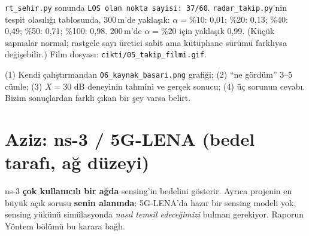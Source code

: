 \documentclass[10.5pt,a4paper]{article}
\begin{document}
\begin{kontrol}
\texttt{rt\_sehir.py} sonunda \texttt{LOS olan nokta sayisi: 37/60}. \texttt{radar\_takip.py}'nin tespit olasılığı tablosunda, 300\,m'de yaklaşık: $\alpha=\%10$: 0,01; \%20: 0,13; \%40: 0,49; \%50: 0,71; \%100: 0,98. 200\,m'de $\alpha=\%20$ için yaklaşık 0,99. (Küçük sapmalar normal; rastgele sayı üretici sabit ama kütüphane sürümü farklıysa değişebilir.) Film dosyası: \texttt{cikti/05\_takip\_filmi.gif}.
\end{kontrol}

\begin{teslim}
(1) Kendi çalıştırmandan \texttt{06\_kaynak\_basari.png} grafiği; (2) ``ne gördüm'' 3--5 cümle; (3) $X=30$ dB deneyinin tahmini ve gerçek sonucu; (4) üç sorunun cevabı. Bizim sonuçlardan farklı çıkan bir şey varsa belirt.
\end{teslim}

\clearpage
\section*{Aziz: ns-3 / 5G-LENA (bedel tarafı, ağ düzeyi)}
\begin{neden}
ns-3 \textbf{çok kullanıcılı bir ağda} sensing'in bedelini gösterir. Ayrıca projenin en büyük açık sorusu \textbf{senin alanında}: 5G-LENA'da hazır bir sensing modeli yok, sensing yükünü simülasyonda \emph{nasıl temsil edeceğimizi} bulman gerekiyor. Raporun Yöntem bölümü bu karara bağlı.
\end{neden}
\end{document}
